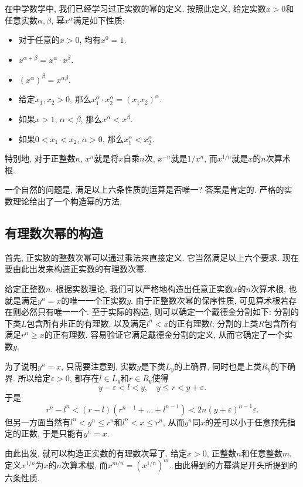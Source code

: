 

在中学数学中, 我们已经学习过正实数的幂的定义. 按照此定义, 给定实数$x>0$和任意实数$\alpha,\beta$, 幂$x^\alpha$满足如下性质:

\begin{itemize}
\item 对于任意的$x>0$, 均有$x^0=1$.
\item $x^{\alpha+\beta}=x^\alpha\cdot x^\beta$.
\item $(x^\alpha)^\beta=x^{\alpha\beta}$.
\item 给定$x_1,x_2>0$, 那么$x_1^\alpha\cdot x_2^\alpha=(x_1x_2)^\alpha$.
\item 如果$x>1$, $\alpha<\beta$, 那么$x^\alpha<x^\beta$.
\item 如果$0<x_1<x_2$, $\alpha>0$, 那么$x_1^\alpha<x_2^\alpha$.
\end{itemize}

特别地, 对于正整数$n$, $x^n$就是将$x$自乘$n$次, $x^{-n}$就是$1/x^n$, 而$x^{1/n}$就是$x$的$n$次算术根. 

一个自然的问题是, 满足以上六条性质的运算是否唯一? 答案是肯定的. 严格的实数理论给出了一个构造幂的方法.

\subsection{有理数次幂的构造}

首先, 正实数的整数次幂可以通过乘法来直接定义. 它当然满足以上六个要求. 现在要由此出发来构造正实数的有理数次幂.

给定正整数$n$. 根据实数理论, 我们可以严格地构造出任意正实数$x$的$n$次算术根, 也就是满足$y^n=x$的唯一一个正实数$y$. 由于正整数次幂的保序性质, 可见算术根若存在则必然只有唯一一个. 至于实际的构造, 则可以确定一个戴德金分割如下: 分割的下类$L$包含所有非正的有理数, 以及满足$l^n<x$的正有理数$l$; 分割的上类$R$包含所有满足$r^n\geq x$的正有理数. 容易验证它满足戴德金分割的定义, 从而它确定了一个实数$y$. 

为了说明$y^n=x$, 只需要注意到, 实数$y$是下类$L_y$的上确界, 同时也是上类$R_y$的下确界. 所以给定$\varepsilon>0$, 都存在$l\in L_y$和$r\in R_y$使得
\[
y-\varepsilon<l<y,\quad y\leq r<y+\varepsilon.
\]
于是
\[ 
r^n-l^n<(r-l)(r^{n-1}+...+l^{n-1})
<2n(y+\varepsilon)^{n-1}\varepsilon.
\]
但另一方面当然有$l^n<y^n\leq r^n$和$l^n<x\leq r^n$, 从而$y^n$同$x$的差可以小于任意预先指定的正数, 于是只能有$y^n=x$.

由此出发, 就可以构造正实数的有理数次幂了. 给定$x>0$, 正整数$n$和任意整数$m$, 定义$x^{1/n}$为$x$的$n$次算术根, 而$x^{m/n}=(x^{1/n})^m$. 由此得到的方幂满足开头所提到的六条性质.


